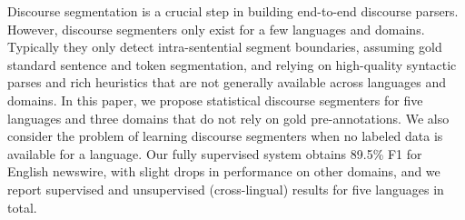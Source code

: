 Discourse segmentation is a crucial step in building end-to-end discourse parsers. However, discourse segmenters only exist for a few languages and domains. Typically they only  detect intra-sentential segment boundaries, assuming gold standard sentence and token segmentation, and relying on high-quality syntactic parses and rich heuristics that are not generally available across languages and domains. In this paper, we propose statistical discourse segmenters for five languages and three domains that do not rely on gold pre-annotations.  We also consider the problem of learning discourse segmenters when no labeled data is available for a language. Our fully supervised system obtains 89.5\% F1 for English newswire, with slight drops in performance on other domains, and we report supervised and unsupervised (cross-lingual) results for five languages in total.
